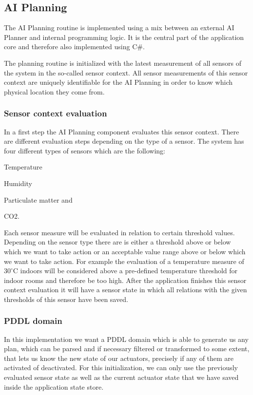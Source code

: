\subsection{AI Planning}\label{subsec:ai-planning}
The AI Planning routine is implemented using a mix between an external AI Planner and internal programming logic.
It is the central part of the application core and therefore also implemented using C\#.

The planning routine is initialized with the latest measurement of all sensors of the system in the so-called sensor context.
All sensor measurements of this sensor context are uniquely identifiable for the AI Planning in order to know which physical location they come from.

\subsubsection{Sensor context evaluation}\label{subsubsec:sensor-context-evaluation}
In a first step the AI Planning component evaluates this sensor context.
There are different evaluation steps depending on the type of a sensor.
The system has four different types of sensors which are the following:
\begin{inparaenum}[1)]
    \item Temperature
    \item Humidity
    \item Particulate matter and
    \item CO2.
\end{inparaenum}

Each sensor measure will be evaluated in relation to certain threshold values.
Depending on the sensor type there are is either a threshold above or below which we want to take action or an acceptable value range above or below which we want to take action.
For example the evaluation of a temperature measure of $30^\circ$C indoors will be considered above a pre-defined temperature threshold for indoor rooms and therefore be too high.
After the application finishes this sensor context evaluation it will have a sensor state in which all relations with the given thresholds of this sensor have been saved.

\subsubsection{PDDL domain}\label{subsubsec:pddl-domain}
In this implementation we want a PDDL domain which is able to generate us any plan, which can be parsed and if necessary filtered or transformed to some extent, that lets us know the new state of our actuators, precisely if any of them are activated of deactivated.
For this initialization, we can only use the previously evaluated sensor state as well as the current actuator state that we have saved inside the application state store.

